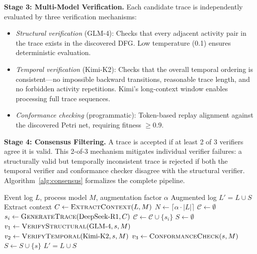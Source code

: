 \documentclass[11pt,a4paper]{article}
\begin{document}
\textbf{Stage 3: Multi-Model Verification.} Each candidate trace is independently evaluated by three verification mechanisms:

\begin{itemize}
    \item \emph{Structural verification} (GLM-4): Checks that every adjacent activity pair in the trace exists in the discovered DFG. Low temperature (0.1) ensures deterministic evaluation.
    \item \emph{Temporal verification} (Kimi-K2): Checks that the overall temporal ordering is consistent---no impossible backward transitions, reasonable trace length, and no forbidden activity repetitions. Kimi's long-context window enables processing full trace sequences.
    \item \emph{Conformance checking} (programmatic): Token-based replay alignment against the discovered Petri net, requiring fitness $\geq 0.9$.
\end{itemize}

\textbf{Stage 4: Consensus Filtering.} A trace is accepted if at least 2 of 3 verifiers agree it is valid. This 2-of-3 mechanism mitigates individual verifier failures: a structurally valid but temporally inconsistent trace is rejected if both the temporal verifier and conformance checker disagree with the structural verifier. Algorithm~\ref{alg:consensus} formalizes the complete pipeline.

\begin{algorithm}[t]
\caption{Multi-LLM Consensus Augmentation}\label{alg:consensus}
\begin{algorithmic}[1]
\Require Event log $L$, process model $M$, augmentation factor $\alpha$
\Ensure Augmented log $L' = L \cup S$
\State Extract context $C \leftarrow \textsc{ExtractContext}(L, M)$ 
\State $N \leftarrow \lceil \alpha \cdot |L| \rceil$ 
\State $\mathcal{C} \leftarrow \emptyset$ 
    \State $s_i \leftarrow \textsc{GenerateTrace}(\text{DeepSeek-R1}, C)$ 
    \State $\mathcal{C} \leftarrow \mathcal{C} \cup \{s_i\}$
\EndFor
\State $S \leftarrow \emptyset$ 
    \State $v_1 \leftarrow \textsc{VerifyStructural}(\text{GLM-4}, s, M)$ 
    \State $v_2 \leftarrow \textsc{VerifyTemporal}(\text{Kimi-K2}, s, M)$
    \State $v_3 \leftarrow \textsc{ConformanceCheck}(s, M)$
     
        \State $S \leftarrow S \cup \{s\}$
    \EndIf
\EndFor
\Return $L' = L \cup S$
\end{algorithmic}
\end{algorithm}
\end{document}
